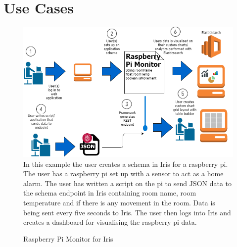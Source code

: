 \documentclass[12pt,a4paper,titlepage]{report}
\begin{document}
\section{Use Cases}
\begin{figure}[H]
\begin{tcolorbox}
\includegraphics[width=\textwidth,height=\textheight,keepaspectratio]{dynamic_performance_framework_pi_flow}
In this example the user creates a schema in Iris for a raspberry pi. The user has a raspberry pi set up with a sensor to act as a home alarm. The user has written a script on the pi to send JSON data to the schema endpoint in Iris containing room name, room temperature and if there is any movement in the room. Data is being sent every five seconds to Iris. The user then logs into Iris and creates a dashboard for visualising the raspberry pi data.
\end{tcolorbox}
\caption{Raspberry Pi Monitor for Iris}
\end{figure}
\end{document}

